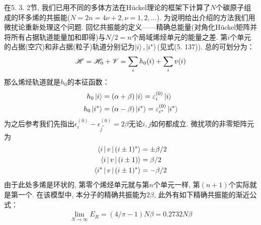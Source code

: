 在5.
3.
2节, 
我们已用不同的多体方法在H\"uckel理论的框架下计算了$N$个碳原子组成的环多烯的共振能($N=2n=4\nu +2,\nu=1,2,\ldots$). 
为说明给出介绍的方法我们用微扰论重新处理这个问题. 
回忆共振能的定义——精确总能量(对角化H\"uckel矩阵并将所有占据轨道能量加和即得)与$N/2=n$个局域烯烃单元的能量之差. 
第$i$个单元的占据(空穴)和非占据(粒子)轨道分别记为$\Ket{i},\Ket{i^*}$(见式(5.
137)). 
总的\ha 可划分为：
\begin{align}
\mathscr{H} = \mathscr{H}_0 + \mathscr{V} = \sum_ih_0(i) + \sum_iv(i)
\end{align}
那么烯烃轨道就是$h_0$的本征函数：
\begin{subequations}
	\begin{align}
	h_0\Ket{i} &= (\alpha+\beta)\Ket{i} = \varepsilon_i^{(0)}\Ket{i}\\
	h_0\Ket{i^*} &= (\alpha-\beta)\Ket{i^*} = \varepsilon_{i^*}^{(0)}\Ket{i^*}
	\end{align}
\end{subequations}
为之后参考我们先指出$\epsilon_i^{(0)} - \epsilon^{(0)}_{j^*}=2\beta$无论$i,j$如何都成立. 
微扰项的非零矩阵元为
\begin{subequations}
	\begin{align}
	\Braket{i|v|(i\pm 1)^*} & = \pm\beta/2\\
	\Braket{i|v|(i\pm 1)} & = \beta/2\\
	\Braket{i^*|v|(i\pm 1)^*} & = -\beta/2\\
	\end{align}
\end{subequations}
由于此处多烯是环状的, 
第零个烯烃单元就与第$n$个单元一样, 
第$(n+1)$个实际就是第一个. 
在该模型中, 
本分子的精确共振能为$2\beta$, 
此外有如下精确共振能的渐近公式：
\begin{align}
\lim\limits_{N\to\infty}E_R = (4/\pi-1)N\beta=0.2732N\beta
\end{align}

